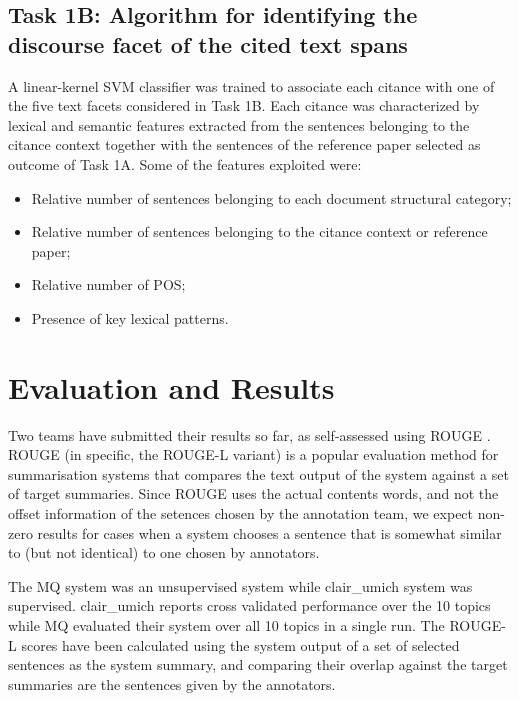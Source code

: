 \documentclass[11pt]{article}
\begin{document}
\subsection{Task 1B: Algorithm for identifying the discourse facet of the 
											cited text spans}
A linear-kernel SVM classifier was trained to associate each citance with one
 of the five text facets considered in Task 1B. Each citance was characterized 
 by lexical and semantic features extracted from the sentences belonging to 
 the citance context together with the sentences of the reference paper 
 selected as outcome of Task 1A.   Some of the features exploited were:
\begin{itemize}
\item{Relative number of sentences belonging to each document
  structural category;}
\vspace{-.3cm}
\item{Relative number of sentences belonging to the citance context or
  reference paper;}
\vspace{-.3cm}
\item{Relative number of POS;}
\vspace{-.3cm}
\item{Presence of key lexical patterns.}
\end{itemize}

\section{Evaluation and Results}
Two teams have submitted their results so far, as self-assessed using
ROUGE \cite{Lin:2004}. ROUGE (in specific, the ROUGE-L variant) is a
popular evaluation method for summarisation systems that compares the
text output of the system against a set of target summaries. Since
ROUGE uses the actual contents words, and not the offset information
of the setences chosen by the annotation team, we expect non-zero
results for cases when a system chooses a sentence that is somewhat
similar to (but not identical) to one chosen by annotators.

The MQ system was an unsupervised system while clair\_umich system was
supervised. clair\_umich reports cross validated performance over the
10 topics while MQ evaluated their system over all 10 topics in a
single run.   
The ROUGE-L scores have been calculated using the system output
of a set of selected sentences as the system summary, and comparing their overlap
against the target summaries are the sentences given by the
annotators. 
\end{document}
